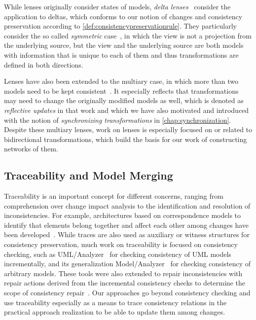 While lenses %
originally consider states of models, \emph{delta lenses}~\cite{diskin2011StateToDeltaSymmetric-MODELS} consider the application to deltas, which conforms to our notion of changes and consistency preservation according to \autoref{def:consistencypreservationrule}.
They particularly consider the so called \emph{symmetric} case~\cite{diskin2011StateToDeltaSymmetric-MODELS}, in which the view is not a projection from the underlying source, but the view and the underlying source are both models with information that is unique to each of them and thus transformations are defined in both directions.

Lenses have also been extended to the multiary case, in which more than two models need to be kept consistent~\cite{diskin2018MultiModelSynchronization-FASE}.
It especially reflects that transformations may need to change the originally modified models as well, which is denoted as \emph{reflective updates} in that work and which we have also motivated and introduced with the notion of \emph{synchronizing transformations} in \autoref{chap:synchronization}.
Despite these multiary lenses, work on lenses is especially focused on or related to bidirectional transformations, which build the basis for our work of constructing networks of them.


\subsection{Traceability and Model Merging}

Traceability is an important concept for different concerns, ranging from comprehension over change impact analysis to the identification and resolution of inconsistencies.
For example, architectures based on correspondence models to identify that elements belong together and affect each other among changes have been developed~\cite{szabo2013traceabilityConsistency-ASWEC}.
While traces are also used as auxiliary or witness structures for consistency preservation, much work on traceability is focused on consistency checking, such as UML/Analyzer~\cite{egyed2006umlanalyzer-ICSE} for checking consistency of \gls{UML} models incrementally, and its generalization Model/Analyzer~\cite{egyed2011modelanalyzer-TSE} for checking consistency of arbitrary models.
These tools were also extended to repair inconsistencies with repair actions derived from the incremental consistency checks to determine the scope of consistency repair~\cite{reder2012resolvingInconsistencies-ASE}.
Our approaches go beyond consistency checking and use traceability especially as a means to trace consistency relations in the practical approach realization to be able to update them among changes.

